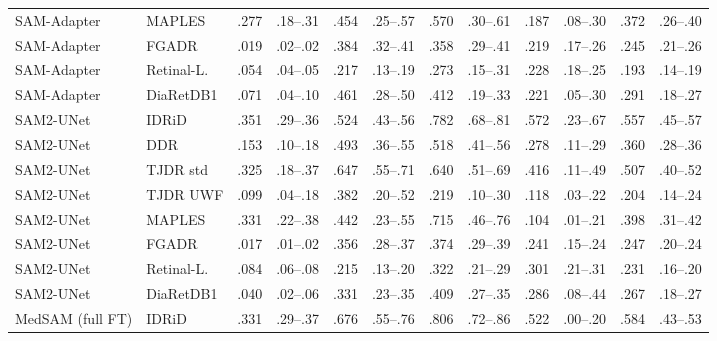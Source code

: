 \begin{landscape}
{\begin{longtable}{l l c c c c c c c c c c}
SAM-Adapter & MAPLES & .277 & \scriptsize .18--.31 & .454 & \scriptsize .25--.57 & .570 & \scriptsize .30--.61 & .187 & \scriptsize .08--.30 & .372 & \scriptsize .26--.40 \\
SAM-Adapter & FGADR & .019 & \scriptsize .02--.02 & .384 & \scriptsize .32--.41 & .358 & \scriptsize .29--.41 & .219 & \scriptsize .17--.26 & .245 & \scriptsize .21--.26 \\
SAM-Adapter & Retinal-L. & .054 & \scriptsize .04--.05 & .217 & \scriptsize .13--.19 & .273 & \scriptsize .15--.31 & .228 & \scriptsize .18--.25 & .193 & \scriptsize .14--.19 \\
SAM-Adapter & DiaRetDB1 & .071 & \scriptsize .04--.10 & .461 & \scriptsize .28--.50 & .412 & \scriptsize .19--.33 & .221 & \scriptsize .05--.30 & .291 & \scriptsize .18--.27 \\
SAM2-UNet & IDRiD & .351 & \scriptsize .29--.36 & .524 & \scriptsize .43--.56 & .782 & \scriptsize .68--.81 & .572 & \scriptsize .23--.67 & .557 & \scriptsize .45--.57 \\
SAM2-UNet & DDR & .153 & \scriptsize .10--.18 & .493 & \scriptsize .36--.55 & .518 & \scriptsize .41--.56 & .278 & \scriptsize .11--.29 & .360 & \scriptsize .28--.36 \\
SAM2-UNet & TJDR std & .325 & \scriptsize .18--.37 & .647 & \scriptsize .55--.71 & .640 & \scriptsize .51--.69 & .416 & \scriptsize .11--.49 & .507 & \scriptsize .40--.52 \\
SAM2-UNet & TJDR UWF & .099 & \scriptsize .04--.18 & .382 & \scriptsize .20--.52 & .219 & \scriptsize .10--.30 & .118 & \scriptsize .03--.22 & .204 & \scriptsize .14--.24 \\
SAM2-UNet & MAPLES & .331 & \scriptsize .22--.38 & .442 & \scriptsize .23--.55 & .715 & \scriptsize .46--.76 & .104 & \scriptsize .01--.21 & .398 & \scriptsize .31--.42 \\
SAM2-UNet & FGADR & .017 & \scriptsize .01--.02 & .356 & \scriptsize .28--.37 & .374 & \scriptsize .29--.39 & .241 & \scriptsize .15--.24 & .247 & \scriptsize .20--.24 \\
SAM2-UNet & Retinal-L. & .084 & \scriptsize .06--.08 & .215 & \scriptsize .13--.20 & .322 & \scriptsize .21--.29 & .301 & \scriptsize .21--.31 & .231 & \scriptsize .16--.20 \\
SAM2-UNet & DiaRetDB1 & .040 & \scriptsize .02--.06 & .331 & \scriptsize .23--.35 & .409 & \scriptsize .27--.35 & .286 & \scriptsize .08--.44 & .267 & \scriptsize .18--.27 \\
MedSAM (full FT) & IDRiD & .331 & \scriptsize .29--.37 & .676 & \scriptsize .55--.76 & .806 & \scriptsize .72--.86 & .522 & \scriptsize .00--.20 & .584 & \scriptsize .43--.53 \\

\end{longtable}}
\end{landscape}

